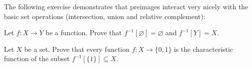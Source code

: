 The following exercise demonstrates that preimages interact very nicely with the basic set operations (intersection, union and relative complement):

\begin{exercise}
Let $f : X \to Y$ be a function. Prove that $f^{-1}[\varnothing] = \varnothing$ and $f^{-1}[Y]=X$.
\end{exercise}

\begin{exercise}
\label{exCharacteristicFunctionsCorrespondWithSubsets}
Let $X$ be a set. Prove that every function $f : X \to \{0,1\}$ is the characteristic function of the subset $f^{-1}[\{1\}] \subseteq X$.
\end{exercise}

